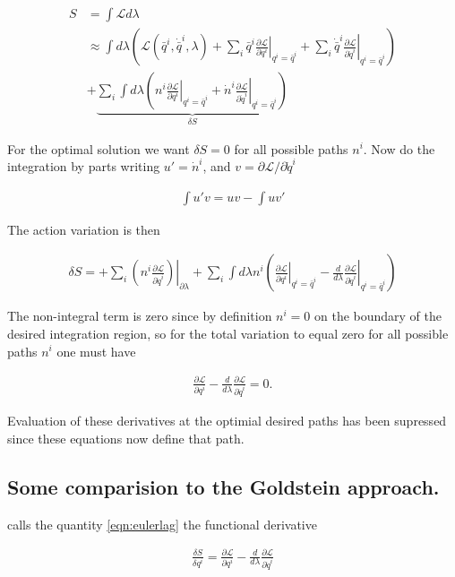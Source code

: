 \documentclass{article}
\newcommand{\LL}[0]{\mathcal{L}}
\newcommand{\qdot}[0]{\dot{q}}
\newcommand{\ndot}[0]{\dot{n}}
\newcommand{\qbar}[0]{\bar{q}}
\newcommand{\qdotbar}[0]{\dot{\bar{q}}}
\newcommand{\PD}[2]{\frac{\partial {#2}}{\partial {#1}}}
\begin{document}
\begin{align*}
S &= \int \LL d\lambda \\
&\approx
\int d\lambda 
\left(
\LL(\qbar^i, \qdotbar^i, \lambda)
+ \sum_i \qbar^i \left. \PD{q^i}{\LL} \right\vert_{q^i = \qbar^i}
+ \sum_i \qdotbar^i \left. \PD{\qdot^i}{\LL} \right\vert_{q^i = \qbar^i}
\right) \\
&+
\underbrace{
\sum_i \int d\lambda
\left(
n^i \left. \PD{q^i}{\LL} \right\vert_{q^i = \qbar^i}
+\ndot^i \left. \PD{\qdot^i}{\LL} \right\vert_{q^i = \qbar^i}
\right)
}_{\delta S}
\end{align*}

For the optimal solution we want $\delta S = 0$ for all possible paths $n^i$.  Now do the integration by parts writing
$u' = \ndot^i$, and $v = \partial \LL/{\partial \qdot^i}$ 

\begin{align*}
\int u' v = u v - \int u v'
\end{align*}

The action variation is then

\begin{align*}
\delta S =
+ \sum_i \left. \left( n^i \PD{\qdot^i}{\LL} \right) \right\vert_{\partial \lambda}
+ \sum_i \int d\lambda n^i
\left(
\left. \PD{q^i}{\LL} \right\vert_{q^i = \qbar^i}
-\frac{d}{d\lambda} \left. \PD{\qdot^i}{\LL} \right\vert_{q^i = \qbar^i}
\right)
\end{align*}

The non-integral term is zero since by definition $n^i = 0$ on the boundary of the desired integration region, so for the
total variation to equal zero for all possible paths $n^i$ one must have

\begin{align}\label{eqn:eulerlag}
\PD{q^i}{\LL} -\frac{d}{d\lambda} \PD{\qdot^i}{\LL} = 0.
\end{align}

Evaluation of these derivatives at the optimial desired paths has been supressed since these equations now define that path.

\subsection{ Some comparision to the Goldstein approach. }

\cite{goldstein1951cm} calls the quantity \ref{eqn:eulerlag} the functional derivative

\begin{align*}
\frac{\delta S}{\delta q^i} = \PD{q^i}{\LL} -\frac{d}{d\lambda} \PD{\qdot^i}{\LL}
\end{align*}
\end{document}
